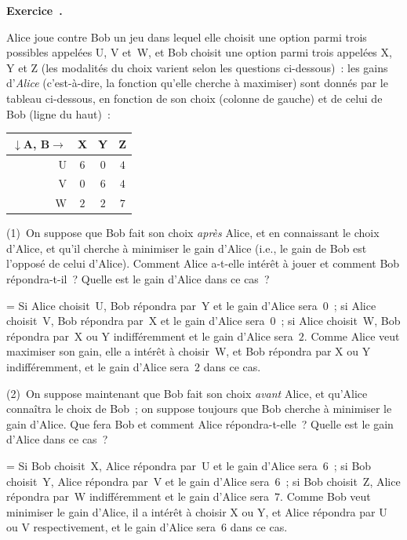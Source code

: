 \documentclass[12pt,a4paper]{article}
\theoremstyle{definition}
\newcommand\exercice{%
\refstepcounter{comcnt}\bigskip\noindent\textbf{Exercice~\thecomcnt.}\par\nobreak}
\newif\ifcorrige
\newenvironment{corrige}%
{\ifcorrige\relax\else\setbox0=\vbox\bgroup\fi%
\smallbreak\noindent{\underbar{\textit{Corrigé.}}\quad}}
{{\hbox{}\nobreak\hfill\checkmark}%
\ifcorrige\relax\else\egroup\fi\par}
\begin{document}
%
%
%

\exercice\label{normal-form-game-exercise-three-by-three}

Alice joue contre Bob un jeu dans lequel elle choisit une option parmi
trois possibles appelées U, V et W, et Bob choisit une option parmi
trois appelées X, Y et Z (les modalités du choix varient selon les
questions ci-dessous) : les gains d'\emph{Alice} (c'est-à-dire, la
fonction qu'elle cherche à maximiser) sont donnés par le tableau
ci-dessous, en fonction de son choix (colonne de gauche) et de celui
de Bob (ligne du haut) :

\begin{center}
\begin{tabular}{r|ccc}
$\downarrow$A, B$\rightarrow$&X&Y&Z\\\hline
U&$6$&$0$&$4$\\
V&$0$&$6$&$4$\\
W&$2$&$2$&$7$\\
\end{tabular}
\end{center}

\smallbreak

(1) On suppose que Bob fait son choix \emph{après} Alice, et en
connaissant le choix d'Alice, et qu'il cherche à minimiser le gain
d'Alice (i.e., le gain de Bob est l'opposé de celui d'Alice).  Comment
Alice a-t-elle intérêt à jouer et comment Bob répondra-t-il ?  Quelle
est le gain d'Alice dans ce cas ?

\begin{corrige}
Si Alice choisit U, Bob répondra par Y et le gain d'Alice sera $0$ ;
si Alice choisit V, Bob répondra par X et le gain d'Alice sera $0$ ;
si Alice choisit W, Bob répondra par X ou Y indifféremment et le gain
d'Alice sera $2$.  Comme Alice veut maximiser son gain, elle a intérêt
à choisir W, et Bob répondra par X ou Y indifféremment, et le gain
d'Alice sera $2$ dans ce cas.
\end{corrige}

\smallbreak

(2) On suppose maintenant que Bob fait son choix \emph{avant} Alice,
et qu'Alice connaîtra le choix de Bob ; on suppose toujours que Bob
cherche à minimiser le gain d'Alice.  Que fera Bob et comment Alice
répondra-t-elle ?  Quelle est le gain d'Alice dans ce cas ?

\begin{corrige}
Si Bob choisit X, Alice répondra par U et le gain d'Alice sera $6$ ;
si Bob choisit Y, Alice répondra par V et le gain d'Alice sera $6$ ;
si Bob choisit Z, Alice répondra par W indifféremment et le gain
d'Alice sera $7$.  Comme Bob veut minimiser le gain d'Alice, il a
intérêt à choisir X ou Y, et Alice répondra par U ou V respectivement,
et le gain d'Alice sera $6$ dans ce cas.
\end{corrige}
\end{document}
